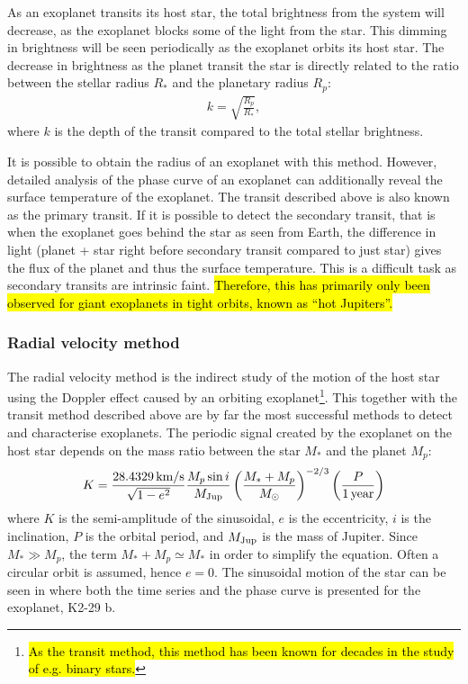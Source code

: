 As an exoplanet transits its host star, the total brightness from the system will decrease, as the
exoplanet blocks some of the light from the star. This dimming in brightness will be seen
periodically as the exoplanet orbits its host star. The decrease in brightness as the planet transit
the star is directly related to the ratio between the stellar radius $R_\ast$ and the planetary
radius $R_p$:
\begin{align}
  k = \sqrt{\frac{R_p}{R_\ast}},  \label{eq:transit}
\end{align}
where $k$ is the depth of the transit compared to the total stellar brightness.

It is possible to obtain the radius of an exoplanet with this method. However, detailed analysis of
the phase curve of an exoplanet can additionally reveal the surface temperature of the exoplanet.
The transit described above is also known as the primary transit. If it is possible to detect the
secondary transit, that is when the exoplanet goes behind the star as seen from Earth, the
difference in light (planet + star right before secondary transit compared to just star) gives the
flux of the planet and thus the surface temperature. This is a difficult task as secondary transits
are intrinsic faint. \hl{Therefore, this has primarily only been observed for giant exoplanets in
tight orbits, known as ``hot Jupiters''.}


\subsubsection{Radial velocity method}
\label{sec:rvmethod}

The radial velocity method is the indirect study of the motion of the host star using the Doppler
effect caused by an orbiting exoplanet\footnote{\hl{As the transit method, this method has been
known for decades in the study of e.g. binary stars.}}. This together with the transit method
described above are by far the most successful methods to detect and characterise exoplanets. The
periodic signal created by the exoplanet on the host star depends on the mass ratio between the star
$M_\ast$ and the planet $M_p$:
\begin{align}
  K = \frac{\SI{28.4329}{km/s}}{\sqrt{1-e^2}} \frac{M_p\sin i}{M_\mathrm{Jup}} \left( \frac{M_\ast+M_p}{M_\odot} \right)^{-2/3} \left(\frac{P}{\SI{1}{year}}\right)  \label{eq:rv}
\end{align}
where $K$ is the semi-amplitude of the sinusoidal, $e$ is the eccentricity, $i$ is the inclination,
$P$ is the orbital period, and $M_\mathrm{Jup}$ is the mass of Jupiter. Since $M_\ast \gg M_p$, the term
$M_\ast+M_p\simeq M_\ast$ in order to simplify the equation. Often a circular orbit is assumed,
hence $e=0$. The sinusoidal motion of the star can be seen in  where both the
time series and the phase curve is presented for the exoplanet, K2-29 b.

